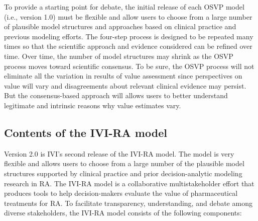 \documentclass[11pt,final,fleqn]{article}
\theoremstyle{plain}
\begin{document}
To provide a starting point for debate, the initial release of each OSVP model (i.e., version 1.0) must be flexible and allow users to choose from a large number of plausible model structures and approaches based on clinical practice and previous modeling efforts. The four-step process is designed to be repeated many times so that the scientific approach and evidence considered can be refined over time. Over time, the number of model structures may shrink as the OSVP process moves toward scientific consensus. To be sure, the OSVP process will not eliminate all the variation in results of value assessment since perspectives on value will vary and disagreements about relevant clinical evidence may persist. But the consensus-based approach will allows users to better understand legitimate and intrinsic reasons why value estimates vary.

\subsection*{Contents of the IVI-RA model}
Version 2.0 is IVI's second release of the IVI-RA model. The model is very flexible and allows users to choose from a large number of the plausible model structures supported by clinical practice and prior decision-analytic modeling research in RA. The IVI-RA model is a collaborative multistakeholder effort that produces tools to help decision-makers evaluate the value of pharmaceutical treatments for RA. To facilitate transparency, understanding, and debate among diverse stakeholders, the IVI-RA model consists of the following components:
\end{document}
